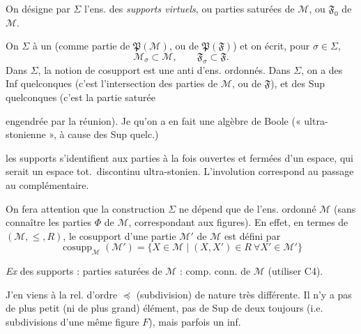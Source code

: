 \documentclass[11pt,a4paper]{article}
\begin{document}
On désigne par $\Sigma$ l'ens. des \emph{supports virtuels}, ou parties saturées  de $\mathcal{M}$, ou  $\mathfrak{F}_0$ de $\mathcal{M}$. \struck{\ill{}}


On \ill{} $\Sigma$ à \struck{\ill{}} un \ill{} (comme partie de $\mathfrak{P}(\mathcal{M})$, ou de $\mathfrak{P}(\mathfrak{F})$) et on écrit, pour $\sigma \in \Sigma$,
\[
  \mathcal{M}_\sigma \subset \mathcal{M}, \qquad \mathfrak{F}_\sigma \subset \mathfrak{F} .
\]
Dans $\Sigma$,  la notion de cosupport est une anti\ill{} d'ens. ordonnés. Dans $\Sigma$, on a des Inf quelconques (c'est l'intersection des parties de $\mathcal{M}$, ou de $\mathfrak{F}$), et des Sup quelconques (c'est la partie saturée

engendrée par la réunion). Je   qu'on a en fait une algèbre de Boole (« ultra-stonienne », à cause des Sup quelc.)

  les supports s'identifient aux parties à la fois ouvertes et fermées d'un espace, qui serait un espace tot.\ discontinu ultra-stonien. L'involution correspond au passage au complémentaire.

On fera attention que la construction  $\Sigma$ ne dépend que de l'ens. ordonné $\mathcal{M}$  (sans connaître  les parties $\Phi$ de $\mathcal{M}$, correspondant aux figures). En effet, en termes de $(\mathcal{M}, \leq, R)$, le cosupport d'une partie $\mathcal{M}'$ de $\mathcal{M}$ est défini par
\[
  \operatorname{cosupp}_{\mathcal{M}}(\mathcal{M}') = \lbrace X \in \mathcal{M} \mid (X, X') \in R \ \forall X' \in \mathcal{M}' \rbrace
\]

\emph{Ex} des supports : parties saturées de $\mathcal{M}$ : \ill{} comp. conn. de $\mathcal{M}$ (utiliser C4).

J'en viens à la rel. d'ordre $\preccurlyeq$ (subdivision) de nature très différente. Il n'y a pas de plus petit (ni de plus grand) élément, pas de Sup de deux \struck{\ill{}}  \struck{$\preccurlyeq$} toujours (i.e. subdivisions d'une même figure $F$), mais parfois un inf.
\end{document}
